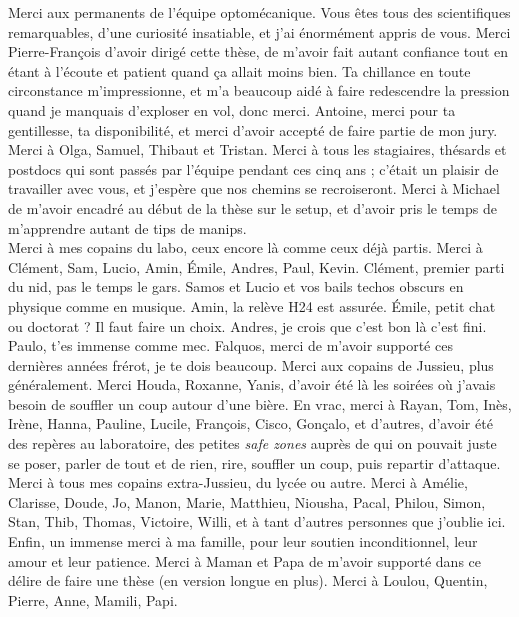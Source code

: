 Merci aux permanents de l’équipe optomécanique. Vous êtes tous des scientifiques remarquables, d’une curiosité insatiable, et j’ai énormément appris de vous. Merci Pierre-François d’avoir dirigé cette thèse, de m’avoir fait autant confiance tout en étant à l’écoute et patient quand ça allait moins bien. Ta chillance en toute circonstance m’impressionne, et m’a beaucoup aidé à faire redescendre la pression quand je manquais d’exploser en vol, donc merci. Antoine, merci pour ta gentillesse, ta disponibilité, et merci d’avoir accepté de faire partie de mon jury. Merci à Olga, Samuel, Thibaut et Tristan. Merci à tous les stagiaires, thésards et postdocs qui sont passés par l’équipe pendant ces cinq ans ; c’était un plaisir de travailler avec vous, et j’espère que nos chemins se recroiseront. Merci à Michael de m’avoir encadré au début de la thèse sur le setup, et d’avoir pris le temps de m’apprendre autant de tips de manips. \\

Merci à mes copains du labo, ceux encore là comme ceux déjà partis. Merci à Clément, Sam, Lucio, Amin, Émile, Andres, Paul, Kevin. Clément, premier parti du nid, pas le temps le gars. Samos et Lucio et vos bails techos obscurs en physique comme en musique. Amin, la relève H24 est assurée. Émile, petit chat ou doctorat ? Il faut faire un choix. Andres, je crois que c'est bon là c'est fini. Paulo, t’es immense comme mec. Falquos, merci de m’avoir supporté ces dernières années frérot, je te dois beaucoup. Merci aux copains de Jussieu, plus généralement. Merci Houda, Roxanne, Yanis, d'avoir été là les soirées où j'avais besoin de souffler un coup autour d'une bière. En vrac, merci à Rayan, Tom, Inès, Irène, Hanna, Pauline, Lucile, François, Cisco, Gonçalo, et d’autres, d’avoir été des repères au laboratoire, des petites \textit{safe zones} auprès de qui on pouvait juste se poser, parler de tout et de rien, rire, souffler un coup, puis repartir d'attaque. \\


Merci à tous mes copains extra-Jussieu, du lycée ou autre. Merci à Amélie, Clarisse, Doude, Jo, Manon, Marie, Matthieu, Niousha, Pacal, Philou, Simon, Stan, Thib, Thomas, Victoire, Willi, et à tant d'autres personnes que j'oublie ici. \\


Enfin, un immense merci à ma famille, pour leur soutien inconditionnel, leur amour et leur patience. Merci à Maman et Papa de m’avoir supporté dans ce délire de faire une thèse (en version longue en plus). Merci à Loulou, Quentin, Pierre, Anne, Mamili, Papi.\\ 

